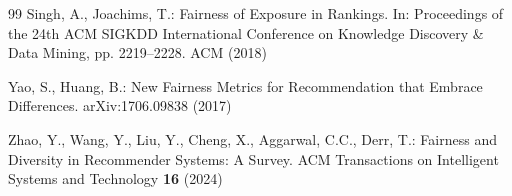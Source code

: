 \documentclass[12pt]{report}
\begin{document}
\begin{thebibliography}{99}
Singh, A., Joachims, T.:
Fairness of Exposure in Rankings.
In: Proceedings of the 24th ACM SIGKDD International Conference on Knowledge Discovery \& Data Mining, pp. 2219--2228. ACM (2018)

Yao, S., Huang, B.:
New Fairness Metrics for Recommendation that Embrace Differences.
arXiv:1706.09838 (2017)

Zhao, Y., Wang, Y., Liu, Y., Cheng, X., Aggarwal, C.C., Derr, T.:
Fairness and Diversity in Recommender Systems: A Survey.
ACM Transactions on Intelligent Systems and Technology \textbf{16} (2024)

\end{thebibliography}
\end{document}
